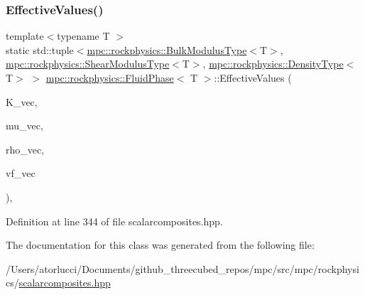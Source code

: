 \subsubsection{\texorpdfstring{Effective\+Values()}{EffectiveValues()}}
{\footnotesize\ttfamily template$<$typename T $>$ \\
static std\+::tuple$<$\mbox{\hyperlink{structmpc_1_1rockphysics_1_1_bulk_modulus_type}{mpc\+::rockphysics\+::\+Bulk\+Modulus\+Type}}$<$T$>$, \mbox{\hyperlink{structmpc_1_1rockphysics_1_1_shear_modulus_type}{mpc\+::rockphysics\+::\+Shear\+Modulus\+Type}}$<$T$>$, \mbox{\hyperlink{structmpc_1_1rockphysics_1_1_density_type}{mpc\+::rockphysics\+::\+Density\+Type}}$<$T$>$ $>$ \mbox{\hyperlink{classmpc_1_1rockphysics_1_1_fluid_phase}{mpc\+::rockphysics\+::\+Fluid\+Phase}}$<$ T $>$\+::Effective\+Values (\begin{DoxyParamCaption}\item[{const std\+::vector$<$ \mbox{\hyperlink{structmpc_1_1rockphysics_1_1_bulk_modulus_type}{mpc\+::rockphysics\+::\+Bulk\+Modulus\+Type}}$<$ T $>$ $>$ \&}]{K\+\_\+vec,  }\item[{const std\+::vector$<$ \mbox{\hyperlink{structmpc_1_1rockphysics_1_1_shear_modulus_type}{mpc\+::rockphysics\+::\+Shear\+Modulus\+Type}}$<$ T $>$ $>$ \&}]{mu\+\_\+vec,  }\item[{const std\+::vector$<$ \mbox{\hyperlink{structmpc_1_1rockphysics_1_1_density_type}{mpc\+::rockphysics\+::\+Density\+Type}}$<$ T $>$ $>$ \&}]{rho\+\_\+vec,  }\item[{const std\+::vector$<$ \mbox{\hyperlink{structmpc_1_1rockphysics_1_1_volume_fraction_type}{mpc\+::rockphysics\+::\+Volume\+Fraction\+Type}}$<$ T $>$ $>$ \&}]{vf\+\_\+vec }\end{DoxyParamCaption})\hspace{0.3cm}{\ttfamily [inline]}, {\ttfamily [static]}}



Definition at line 344 of file scalarcomposites.\+hpp.



The documentation for this class was generated from the following file\+:\begin{DoxyCompactItemize}
\item 
/\+Users/atorlucci/\+Documents/github\+\_\+threecubed\+\_\+repos/mpc/src/mpc/rockphysics/\mbox{\hyperlink{scalarcomposites_8hpp}{scalarcomposites.\+hpp}}\end{DoxyCompactItemize}
